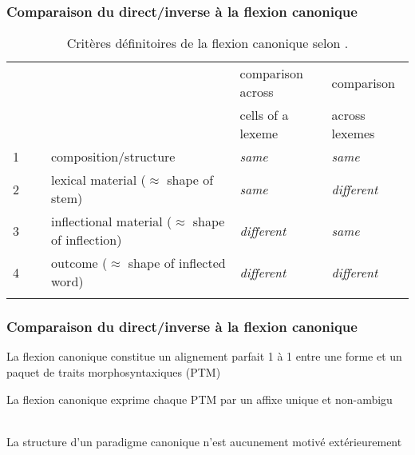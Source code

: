 \begin{frame}
\frametitle{Comparaison du direct/inverse à la flexion canonique}
\subtitle{La flexion canonique selon \cite{corbett07b}}
\begin{table}\centering\scriptsize
\noindent\begin{tabular}{ll@{~~~}l@{~~~}l}
\hline
&&{\sc comparison across }&{\sc
  comparison }\\
&&{\sc cells of a lexeme}&{\sc
  across lexemes}\\
\hline
1~~~&{\sc composition/structure} & {\em same}& {\em same}\\
2~~~&{\sc lexical material}  ($\approx$ shape of stem) & {\em same}& {\em different}\\
3~~~&{\sc inflectional material} ($\approx$ shape of inflection)& {\em different}& {\em same}\\
4~~~&{\sc outcome}  ($\approx$ shape of inflected word)& {\em different}& {\em different}\\\hline
&\\[-6pt]
\end{tabular}
\caption{\Small Critères définitoires de la flexion canonique selon \protect\cite{corbett07b}.}
\label{tbl:caninfl}
\end{table}
\end{frame}

\begin{frame}
\frametitle{Comparaison du direct/inverse à la flexion canonique}
\subtitle{La flexion canonique selon \cite{corbett07b}}
\begin{smallwideitemize}
\item La flexion canonique constitue un alignement parfait 1 à 1 entre une forme et un paquet de traits morphosyntaxiques (PTM)\pause ~~~\\
\item La flexion canonique exprime chaque PTM par un affixe unique et non-ambigu \pause ~~~\\
\item La structure d'un paradigme canonique n'est aucunement motivé extérieurement \pause ~~~\\

\end{smallwideitemize}

\end{frame}